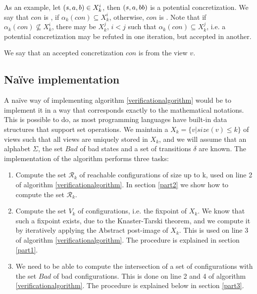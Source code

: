 As an example, let $(s, a, b) \in X_k^i$, then $(s, a, bb)$ is a potential concretization. We say that $con$ is , if $\alpha_k(con) \subseteq X_k^i$, otherwise, $con$ is . Note that if $\alpha_k(con) \not\subseteq X_k^i$, there may be $X_k^j$, $i < j$ such that $\alpha_k(con) \subseteq X_k^j$, i.e. a potential concretization may be refuted in one iteration, but accepted in another.

We say that an accepted concretization $con$ is  from the view $v$.

\subsection{Naïve implementation}
\label{Apost}
A naïve way of implementing algorithm \ref{verificationalgorithm} would be to implement it in a way that corresponds exactly to the mathematical notations. This is possible to do, as most programming languages have built-in data structures that support set operations. We maintain a  $X_k = \{v | size(v) \leq k\}$ of views such that all views are uniquely stored in $X_k$, and we will assume that an alphabet $\Sigma$, the set $Bad$ of bad states and a set of transitions $\delta$ are known. The implementation of the algorithm performs three tasks:

\begin{enumerate}
\item
Compute the set $\mathcal{R}_k$ of reachable configurations of size up to k, used on line 2 of algorithm \ref{verificationalgorithm}. In section \ref{part2} we show how to compute the set $\mathcal{R}_k$.

\item
Compute the set $V_k$ of configurations, i.e. the fixpoint of $X_k$. We know that such a fixpoint exists, due to the Knaster-Tarski theorem\cite{tarski}, and we compute it by iteratively applying the Abstract post-image of $X_k$. This is used on line 3 of algorithm \ref{verificationalgorithm}. The procedure is explained in section \ref{part1}.
\item
We need to be able to compute the intersection of a set of configurations with the set $Bad$ of bad configurations. This is done on line 2 and 4 of algorithm \ref{verificationalgorithm}. The procedure is explained below in section \ref{part3}.
\end{enumerate}

